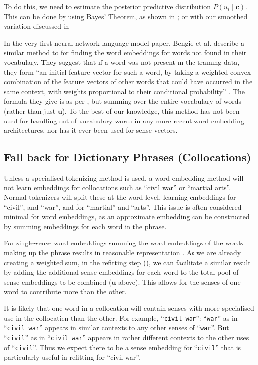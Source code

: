 \documentclass{sig-alternate}
\renewcommand{\c}{\mathbf{c}}
\renewcommand{\u}{\mathbf{u}}
\newcommand{\wordquote}[1]{\enquote{\texttt{#1}}}
\begin{document}
To do this, we need to estimate the posterior predictive distribution $P(u_i \mid \c)$.
This can be done by using Bayes' Theorem, as shown in ; or with our smoothed variation discussed in 


In the very first neural network language model paper, Bengio et al. \parencite{NPLM} describe a similar method to  for finding the word embeddings for words not found in their vocabulary. They suggest that if a word was not present in the training data, they form \enquote{an initial feature vector for such a word, by taking a weighted convex combination of the feature vectors of other words that could have occurred in the same context, with weights proportional to their conditional probability} \parencite{NPLM}. The formula they give is as per , but summing over the entire vocabulary of words (rather than just $\u$). To the best of our knowledge, this method has not been used for handling out-of-vocabulary words in any more recent word embedding architectures, nor has it ever been used for sense vectors.


\subsection {Fall back for Dictionary Phrases (Collocations)}
Unless a specialised tokenizing method is used, a word embedding method will not learn embeddings for collocations such as ``civil war'' or ``martial arts''. Normal tokenizers will split these at the word level, learning embeddings for ``civil'', and ``war'', and for ``martial'' and ``arts''. This issue is often considered minimal for word embeddings, as an approximate embedding can be constructed by summing embeddings for each word in the phrase.

For single-sense word embeddings  summing the word embeddings of the words making up the phrase results in reasonable representation \parencite{mikolovSkip, White2015SentVecMeaning}.
As we are already creating a weighted sum, in the refitting step (), we can facilitate a similar result by adding the additional sense embeddings for each word to the total pool of sense embeddings to be combined ($\u$ above). This allows for the senses of one word to contribute more than the other.

It is likely that one word in a collocation will contain senses with more specialised use in the collocation than the other.
For example, \wordquote{civil war}: \wordquote{war} as in \wordquote{civil war} appears in similar contexts to any other senses of \wordquote{war}.
But \wordquote{civil} as in \wordquote{civil war} appears in rather different contexts to the other uses of \wordquote{civil}. Thus we expect there to be a sense embedding for \wordquote{civil} that is particularly useful in refitting for \enquote{civil war}.
\end{document}
